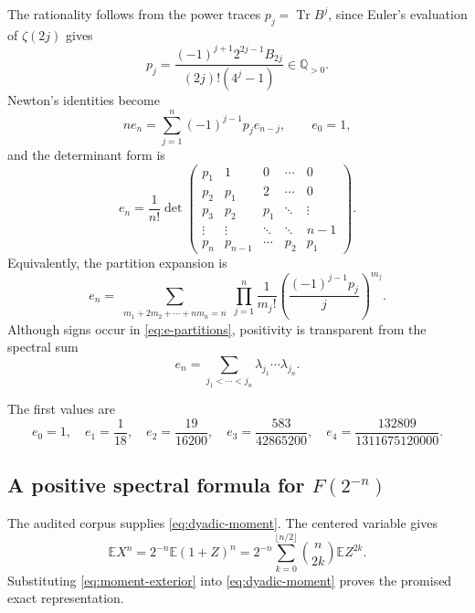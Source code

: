 \documentclass[11pt,oneside]{article}
\theoremstyle{definition}
\newcommand{\E}{\mathbb E}
\newcommand{\Tr}{\operatorname{Tr}}
\begin{document}
The rationality follows from the power traces
\(p_j=\Tr B^j\), since Euler's evaluation of \(\zeta(2j)\) gives
\begin{equation}
 p_j=\frac{(-1)^{j+1}2^{2j-1}B_{2j}}
 {(2j)!(4^j-1)}\in\mathbb Q_{>0}.
 \label{eq:p-Bernoulli}
\end{equation}
Newton's identities become
\begin{equation}
 ne_n=\sum_{j=1}^{n}(-1)^{j-1}p_j e_{n-j},
 \qquad e_0=1,
 \label{eq:Newton-e}
\end{equation}
and the determinant form is
\begin{equation}
 e_n=\frac1{n!}
 \det\begin{pmatrix}
 p_1&1&0&\cdots&0\\
 p_2&p_1&2&\cdots&0\\
 p_3&p_2&p_1&\ddots&\vdots\\
 \vdots&\vdots&\ddots&\ddots&n-1\\
 p_n&p_{n-1}&\cdots&p_2&p_1
 \end{pmatrix}.
 \label{eq:e-determinant}
\end{equation}
Equivalently, the partition expansion is
\begin{equation}
 e_n=\sum_{\substack{m_1+2m_2+\cdots+nm_n=n}}
 \prod_{j=1}^{n}
 \frac1{m_j!}\left(\frac{(-1)^{j-1}p_j}{j}\right)^{m_j}.
 \label{eq:e-partitions}
\end{equation}
Although signs occur in \eqref{eq:e-partitions}, positivity is transparent from the
spectral sum
\begin{equation}
 e_n=\sum_{j_1<\cdots<j_n}\lambda_{j_1}\cdots\lambda_{j_n}.
 \label{eq:e-spectral-sum}
\end{equation}

The first values are
\begin{equation}
 e_0=1,
 \quad e_1=\frac1{18},
 \quad e_2=\frac{19}{16200},
 \quad e_3=\frac{583}{42865200},
 \quad e_4=\frac{132809}{1311675120000}.
 \label{eq:first-e}
\end{equation}

\subsection{A positive spectral formula for \(F(2^{-n})\)}

The audited corpus supplies \eqref{eq:dyadic-moment}.  The centered variable gives
\begin{equation}
 \E X^n=2^{-n}\E(1+Z)^n
 =2^{-n}\sum_{k=0}^{\lfloor n/2\rfloor}
 \binom n{2k}\E Z^{2k}.
 \label{eq:X-centered-moment}
\end{equation}
Substituting \eqref{eq:moment-exterior} into
\eqref{eq:dyadic-moment} proves the promised exact representation.
\end{document}
